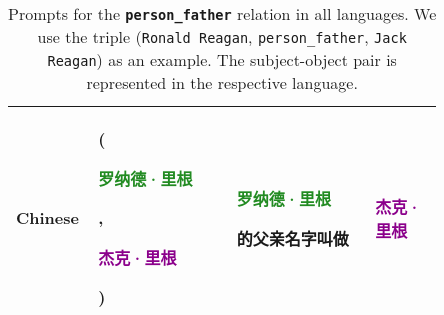 \begin{table*}[htbp]
\begin{center}
\begin{tabular}{m{0.10\linewidth} p{0.30\linewidth} p{0.30\linewidth} m{0.15\linewidth}}
\midrule
{\centering Chinese} 
    & {\raggedright (\textcolor{forestgreen}{\begin{CJK}{UTF8}{gbsn}罗纳德·里根\end{CJK}}, \textcolor{darkmagenta}{\begin{CJK}{UTF8}{gbsn}杰克·里根\end{CJK}})}
    & \textcolor{forestgreen}{\begin{CJK}{UTF8}{gbsn}罗纳德·里根\end{CJK}}\begin{CJK}{UTF8}{gbsn}的父亲名字叫做\end{CJK}
    & {\centering \textcolor{darkmagenta}{\begin{CJK}{UTF8}{gbsn}杰克·里根\end{CJK}}} \\
\bottomrule
\end{tabular}
\end{center}
\caption{Prompts for the \textbf{\texttt{person\_father}} relation in all languages. We use the triple (\texttt{Ronald Reagan}, \texttt{person\_father}, \texttt{Jack Reagan}) as an example. The subject-object pair is represented in the respective language.}
\label{tab:prompts_person_father}
\end{table*}


